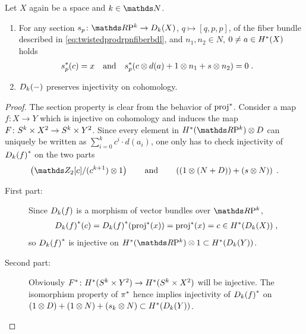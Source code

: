 \begin{Cor}
  Let $X$ again be a space and $k\in\Nat$.
  \begin{enumerate}
  \item
    For any section $s_p\colon\RP k\to\Twistedprod{k}{X}$, $q\mapsto[q,p,p]$,
    of the fiber bundle described in
    \eqref{eq:twistedprodrpnfiberbdl}, and $n_1,n_2\in N$, $0\neq a\in H^*(X)$ holds
    \begin{align}\label{eq:twistedprodcohom:section}
      {s}^*_p(c) &= x
      &\text{and}&
      &{s}^*_p(c\otimes d(a) + 1\otimes n_1 + s\otimes n_2) &= 0
                                                              \;.
    \end{align}
  \item\label{item:twistedprod:preservescohominj}
    $D_{k}({-})$ preserves injectivity on cohomology.
  \end{enumerate}
  \begin{proof}
    The section property is clear from the behavior of ${\mathrm{proj}}^*$.
    Consider a map $f\colon X\to Y$ which is injective on cohomology
    and induces the map
    $F\colon S^{k}\times X^2\to S^{k}\times Y^2$.
    Since every element in $\H^*(\RP k)\otimes D$ can uniquely be
    written as $\sum_{i=0}^k c^i\cdot d(a_i)$,
    one only has to check injectivity of ${D_{k}({f})}^*$ on
    the two parts
    \begin{gather*}
      \left( \Zmod2[c]/(c^{k+1})\otimes 1 \right)
      \qquad\text{and}\qquad
      \left(
        (1\otimes (N+D)) + (s\otimes N)
      \right)
      \;.
    \end{gather*}
    \begin{description}
    \item[First part:]
      Since $D_{k}({f})$ is a morphism of vector bundles over
      $\RP k$,
      \begin{gather*}
        {D_{k}({f})}^*(c)
        = {D_{k}({f})}^*({\mathrm{proj}}^*(x))
        = {\mathrm{proj}}^*(x)
        = c
        \in H^*(D_{k}({X}))
        \;,
      \end{gather*}
      so ${D_{k}({f})}^*$ is injective on
      $\H^*(\RP k)\otimes 1\subset\H^*(\Twistedprod k Y)$.
    \item[Second part:]
      Obviously
      ${F}^*\colon H^*(S^{k}\times Y^2)\to H^*(S^{k}\times X^2)$ 
      will be injective. The isomorphism property of ${\pi}^*$ hence
      implies injectivity of ${D_{k}({f})}^*$ on
      $(1\otimes D)+(1\otimes N)+(s_k\otimes N)\subset H^*(D_{k}({Y}))$.
      \qedhere
    \end{description}
  \end{proof}
\end{Cor}


